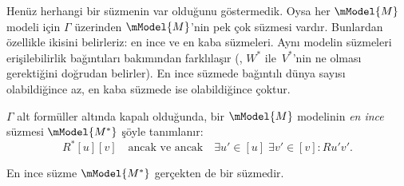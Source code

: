 



Henüz herhangi bir süzmenin var olduğunu göstermedik. Oysa her
$\mModel{M}$ modeli için $\Gamma$ üzerinden $\mModel{M}$'nin pek çok
süzmesi vardır. Bunlardan özellikle ikisini belirleriz: en ince ve en kaba
süzmeleri. Aynı modelin süzmeleri erişilebilirlik bağıntıları bakımından
  farklılaşır (, $W^*$ ile~$V^*$'nin ne olması
gerektiğini doğrudan belirler). En ince süzmede bağıntılı dünya sayısı
olabildiğince az, en kaba süzmede ise olabildiğince çoktur.

\begin{defn}
  $\Gamma$ alt formüller altında kapalı olduğunda, bir $\mModel{M}$
  modelinin \emph{en ince} süzmesi $\mModel{M^*}$ şöyle tanımlanır:
  \[
  R^*[u][v] \quad \text{ancak ve ancak} \quad \exists u'\in [u] \;
  \exists v' \in [v] : Ru'v'.
  \]
\end{defn}

\begin{prop}
  En ince süzme $\mModel{M^*}$ gerçekten de bir süzmedir.
\end{prop}

